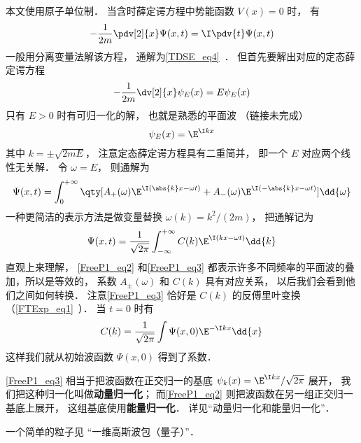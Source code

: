 

本文使用原子单位制． 当含时薛定谔方程中势能函数 $V(x) = 0$ 时， 有
\begin{equation}\label{FreeP1_eq1}
-\frac{1}{2m}\pdv[2]{x}\Psi(x,t) = \I \pdv{t} \Psi(x,t)
\end{equation}
一般用分离变量法解该方程， 通解为\autoref{TDSE_eq4}~． 但首先要解出对应的定态薛定谔方程
\begin{equation}
-\frac{1}{2m}\dv[2]{x}\psi_E(x) = E \psi_E(x)
\end{equation}
只有 $E > 0$ 时有可归一化的解， 也就是熟悉的平面波 （链接未完成）
\begin{equation}
\psi_E(x) = \E^{\I k x}
\end{equation}
其中 $k = \pm\sqrt{2mE}$， 注意定态薛定谔方程具有二重简并， 即一个 $E$ 对应两个线性无关解． 令 $\omega = E$， 则通解为
\begin{equation}\label{FreeP1_eq2}
\Psi(x,t) = \int_{0}^{+\infty} \qty[A_+(\omega) \E^{\I (\abs{k}x - \omega t)} + A_-(\omega) \E^{\I (-\abs{k}x - \omega t)}] \dd{\omega}
\end{equation}
一种更简洁的表示方法是做变量替换 $\omega(k) = k^2/(2m)$， 把通解记为
\begin{equation}\label{FreeP1_eq3}
\Psi(x,t) = \frac{1}{\sqrt{2\pi}} \int_{-\infty}^{+\infty} C(k) \E^{\I (k x - \omega t)} \dd{k}
\end{equation}
直观上来理解， \autoref{FreeP1_eq2} 和\autoref{FreeP1_eq3} 都表示许多不同频率的平面波的叠加，所以是等效的， 系数 $A_\pm(\omega)$ 和 $C(k)$ 具有对应关系， 以后我们会看到他们之间如何转换． 注意\autoref{FreeP1_eq3} 恰好是 $C(k)$ 的反傅里叶变换（\autoref{FTExp_eq1}~）． 当 $t = 0$ 时有
\begin{equation}
C(k) = \frac{1}{\sqrt{2\pi}} \int \Psi(x,0) \E^{-\I k x} \dd{x}
\end{equation}
这样我们就从初始波函数 $\Psi(x,0)$ 得到了系数．

\autoref{FreeP1_eq3} 相当于把波函数在正交归一的基底 $\psi_k(x) = \E^{\I kx}/\sqrt{2\pi}$ 展开， 我们把这种归一化叫做\textbf{动量归一化}； 而\autoref{FreeP1_eq2} 则把波函数在另一组正交归一基底上展开， 这组基底使用\textbf{能量归一化}． 详见“动量归一化和能量归一化”．

一个简单的粒子见 “一维高斯波包（量子）”．
